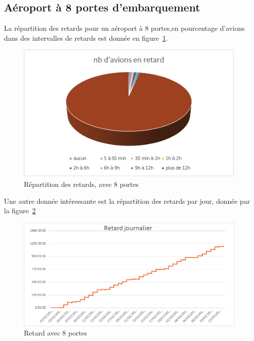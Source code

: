  \subsection{Aéroport à 8 portes d'embarquement}
La répartition des retards pour un aéroport à 8 portes,en pourcentage d'avions dans des intervalles de retards est donnée en figure~\ref{retard_camenbert_8}.
  \graphicspath{{donnees/graph_90jours/8portes/}}
\begin{figure}[H]
\centering \includegraphics[scale=0.6]{retard_avions.png}
 \caption{\label{retard_camenbert_8} Répartition des retards, avec 8 portes} 
\end{figure}
 
 Une autre donnée intéressante est la répartition des retards par jour, donnée par la figure~\ref{retard_jour_8}
\begin{figure}[H]
\centering \includegraphics[scale=0.6]{retard_jour.png}
 \caption{\label{retard_jour_8} Retard avec 8 portes} 
\end{figure}
 
